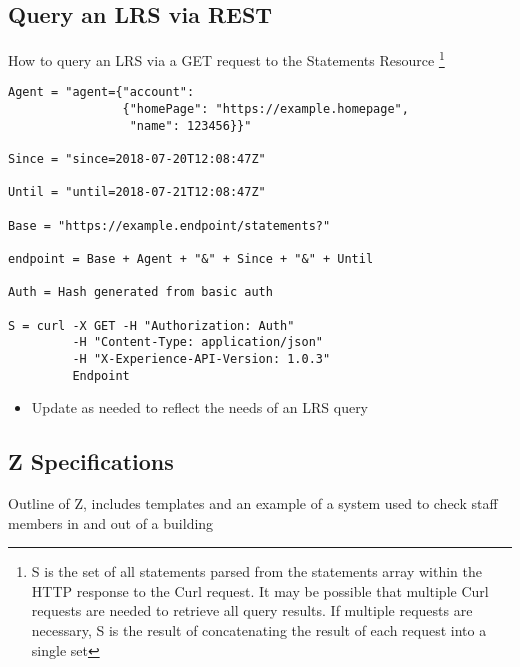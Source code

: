 \documentclass{article}
\begin{document}
  \subsection{Query an LRS via REST}
  How to query an LRS via a GET request to the Statements Resource
  \footnote{\label{moreLink} S is the set of all statements parsed from the statements array within the HTTP response to the Curl request. It may be possible that multiple Curl requests are needed to retrieve all query results. If multiple requests are necessary, S is the result of concatenating the result of each request into a single set}
  \begin{lstlisting}[frame=single]
Agent = "agent={"account":
                {"homePage": "https://example.homepage",
                 "name": 123456}}"

Since = "since=2018-07-20T12:08:47Z"

Until = "until=2018-07-21T12:08:47Z"

Base = "https://example.endpoint/statements?"

endpoint = Base + Agent + "&" + Since + "&" + Until

Auth = Hash generated from basic auth

S = curl -X GET -H "Authorization: Auth"
         -H "Content-Type: application/json"
         -H "X-Experience-API-Version: 1.0.3"
         Endpoint
       \end{lstlisting}
\begin{itemize}
  \item Update as needed to reflect the needs of an LRS query
  \end{itemize}

\subsection{Z Specifications}
Outline of Z, includes templates and an example of a system used to check staff members in and out of a building
\end{document}
